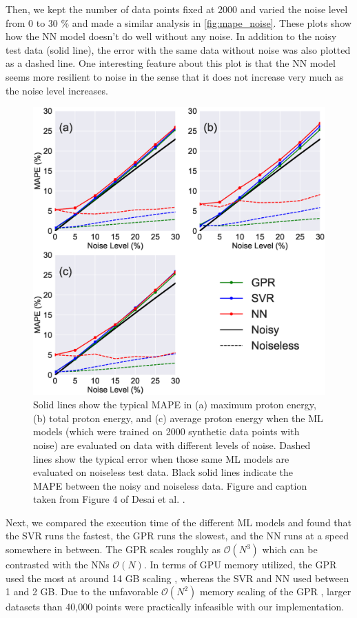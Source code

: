 Then, we kept the number of data points fixed at 2000 and varied the noise level from 0 to 30 \% and made a similar analysis in \autoref{fig:mape_noise}. These plots show how the \gls{NN} model doesn't do well without any noise. In addition to the noisy test data (solid line), the error with the same data without noise was also plotted as a dashed line. One interesting feature about this plot is that the \gls{NN} model seems more resilient to noise in the sense that it does not increase very much as the noise level increases. 

\begin{figure}
	\centering 
	\includegraphics[width=0.75\linewidth]{planning/images/paper1/test_mape_points=2.0k.eps}
	\caption{Solid lines show the typical \gls{MAPE} in (a) maximum proton energy, (b) total proton energy, and (c) average proton energy when the \gls{ML} models (which were trained on 2000 synthetic data points with noise) are evaluated on data with different levels of noise. Dashed lines show the typical error when those same ML models are evaluated on noiseless test data. Black solid lines indicate the \gls{MAPE} between the noisy and noiseless data. Figure and caption taken from Figure 4 of Desai et al. \cite{Desai_2024_CPP}.}
	\label{fig:mape_noise}
\end{figure}

Next, we compared the execution time of the different \gls{ML} models and found that the \gls{SVR} runs the fastest, the \gls{GPR} runs the slowest, and the \gls{NN} runs at a speed somewhere in between. The \gls{GPR} scales roughly as $\mathcal{O}(N^3)$ \cite{Wang_2019_GPytorch} which can be contrasted with the \gls{NN}s $\mathcal{O}(N)$. In terms of GPU memory utilized, the \gls{GPR} used the most at around 14 GB scaling \cite{Wang_2019_GPytorch}, whereas the \gls{SVR} and \gls{NN} used between 1 and 2 GB. Due to the unfavorable $\mathcal{O}(N^2)$ memory scaling of the \gls{GPR} \cite{Wang_2019_GPytorch}, larger datasets than 40,000 points were practically infeasible with our implementation.

